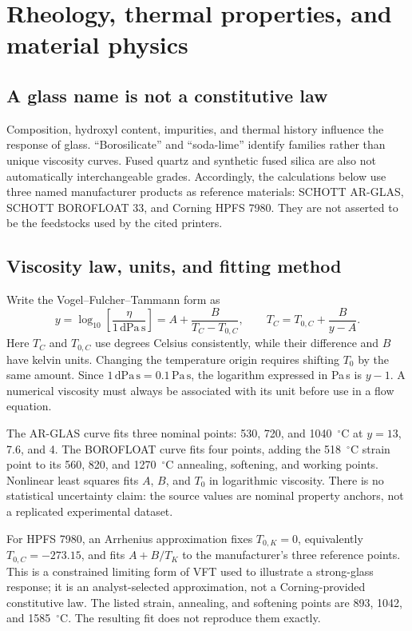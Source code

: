 \section{Rheology, thermal properties, and material physics}
\label{sec:physics}
\subsection{A glass name is not a constitutive law}
Composition, hydroxyl content, impurities, and thermal history influence the response of glass. ``Borosilicate'' and ``soda-lime'' identify families rather than unique viscosity curves. Fused quartz and synthetic fused silica are also not automatically interchangeable grades. Accordingly, the calculations below use three named manufacturer products as reference materials: SCHOTT AR-GLAS, SCHOTT BOROFLOAT 33, and Corning HPFS 7980. They are not asserted to be the feedstocks used by the cited printers.\cite{phys_ar,phys_boro,phys_silica}

\subsection{Viscosity law, units, and fitting method}
Write the Vogel--Fulcher--Tammann form as
\begin{equation}
 y=\log_{10}\!\left[\frac{\eta}{1\,\mathrm{dPa\,s}}\right]
 =A+\frac{B}{T_C-T_{0,C}},\qquad
 T_C=T_{0,C}+\frac{B}{y-A}.
\label{eq:vft}
\end{equation}
Here $T_C$ and $T_{0,C}$ use degrees Celsius consistently, while their difference and $B$ have kelvin units. Changing the temperature origin requires shifting $T_0$ by the same amount. Since $1\,\mathrm{dPa\,s}=0.1\,\mathrm{Pa\,s}$, the logarithm expressed in Pa\,s is $y-1$. A numerical viscosity must always be associated with its unit before use in a flow equation.

The AR-GLAS curve fits three nominal points: 530, 720, and 1040~$^{\circ}$C at $y=13$, 7.6, and 4. The BOROFLOAT curve fits four points, adding the 518~$^{\circ}$C strain point to its 560, 820, and 1270~$^{\circ}$C annealing, softening, and working points. Nonlinear least squares fits $A$, $B$, and $T_0$ in logarithmic viscosity. There is no statistical uncertainty claim: the source values are nominal property anchors, not a replicated experimental dataset.\cite{phys_ar,phys_boro}

For HPFS 7980, an Arrhenius approximation fixes $T_{0,K}=0$, equivalently $T_{0,C}=-273.15$, and fits $A+B/T_K$ to the manufacturer's three reference points. This is a constrained limiting form of VFT used to illustrate a strong-glass response; it is an analyst-selected approximation, not a Corning-provided constitutive law. The listed strain, annealing, and softening points are 893, 1042, and 1585~$^{\circ}$C. The resulting fit does not reproduce them exactly.\cite{phys_silica}

